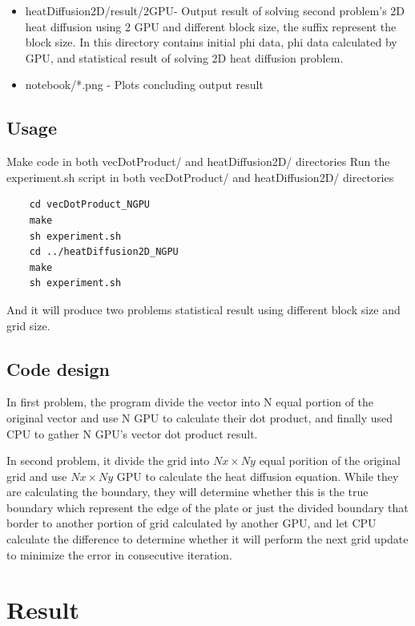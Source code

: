 \documentclass{article}
\begin{document}
\begin{itemize}
		\item heatDiffusion2D/result/2GPU\textunderscore* - Output result of solving second problem's 2D heat diffusion using 2 GPU and different block size, the suffix represent the block size. In this directory contains initial phi data, phi data calculated by GPU, and statistical result of solving 2D heat diffusion problem.
		\item notebook/*.png - Plots concluding output result
	\end{itemize}
	
	
	\subsection{Usage}
	Make code in both vecDotProduct/ and heatDiffusion2D/ directories
	Run the experiment.sh script in both vecDotProduct/ and heatDiffusion2D/ directories 
	
	\begin{verbatim}
	cd vecDotProduct_NGPU
	make
	sh experiment.sh
	cd ../heatDiffusion2D_NGPU
	make
	sh experiment.sh
	\end{verbatim}
	
	And it will produce two problems statistical result using different block size and grid size.

	\subsection{Code design}
	In first problem, the program divide the vector into N equal portion of the original vector and use N GPU to calculate their dot product, and finally used CPU to gather N GPU's vector dot product result.
	
	In second problem, it divide the grid into $Nx\times{Ny}$ equal porition of the original grid and use $Nx\times{Ny}$ GPU to calculate the heat diffusion equation. While they are calculating the boundary, they will determine whether this is the true boundary which represent the edge of the plate or just the divided boundary that border to another portion of grid calculated by another GPU, and let CPU calculate the difference to determine whether it will perform the next grid update to minimize the error in consecutive iteration.

	\section{Result}
\end{document}
